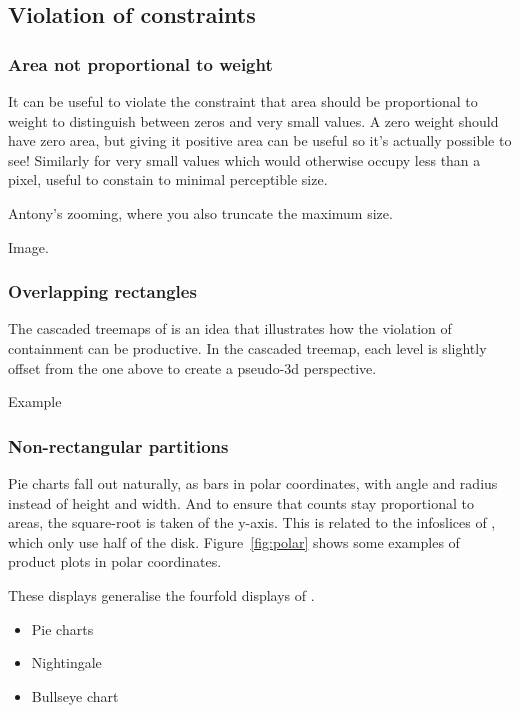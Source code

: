 \documentclass[letterpaper,oneside]{scrartcl}
\begin{document}
\subsection{Violation of constraints}

\subsubsection{Area not proportional to weight}

It can be useful to violate the constraint that area should be proportional to weight to distinguish between zeros and very small values.  A zero weight should have zero area, but giving it positive area can be useful so it's actually possible to see!  Similarly for very small values which would otherwise occupy less than a pixel, useful to constain to minimal perceptible size.

Antony's zooming, where you also truncate the maximum size.

Image.

\subsubsection{Overlapping rectangles}

The cascaded treemaps of \citet{lu:2008} is an idea that illustrates how the violation of containment can be productive.  In the cascaded treemap, each level is slightly offset from the one above to create a pseudo-3d perspective.

Example

\subsubsection{Non-rectangular partitions}

Pie charts fall out naturally, as bars in polar coordinates, with angle and radius instead of height and width. And to ensure that counts stay proportional to areas, the square-root is taken of the y-axis. This is related to the infoslices of \citet{andrews:1998}, which only use half of the disk. Figure~\ref{fig:polar} shows some examples of product plots in polar coordinates.

These displays generalise the fourfold displays of \citet{friendly:1995}. 

\begin{itemize}
  \item Pie charts
  \item Nightingale
  \item Bullseye chart 
\end{itemize}
\end{document}
